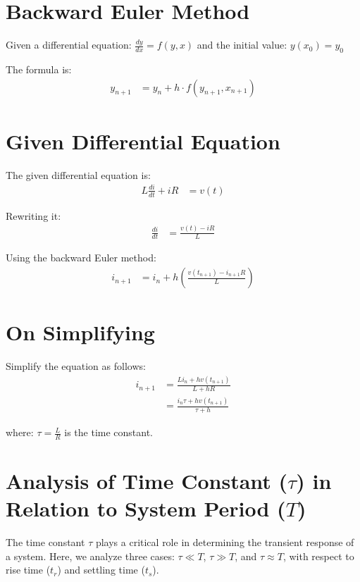 \documentclass{article}
\begin{document}
\section*{Backward Euler Method}

Given a differential equation:  
$ \frac{dy}{dx} = f(y, x) $  
and the initial value:  
$ y(x_0) = y_0 $  

The formula is:  
\begin{align*}
y_{n+1} &= y_n + h \cdot f(y_{n+1}, x_{n+1})
\end{align*}

\section*{Given Differential Equation}

The given differential equation is:  
\begin{align*}
L \frac{di}{dt} + iR &= v(t)
\end{align*}

Rewriting it:  
\begin{align*}
\frac{di}{dt} &= \frac{v(t) - iR}{L}
\end{align*}

Using the backward Euler method:  
\begin{align*}
i_{n+1} &= i_n + h \left( \frac{v(t_{n+1}) - i_{n+1}R}{L} \right)
\end{align*}

\section*{On Simplifying}

Simplify the equation as follows:  
\begin{align*}
i_{n+1} &= \frac{L i_n + h v(t_{n+1})}{L + hR} \\
&= \frac{i_n \tau + h v(t_{n+1})}{\tau + h}
\end{align*}

where:  
$ \tau = \frac{L}{R} $ is the time constant.


\section*{Analysis of Time Constant ($\tau$) in Relation to System Period ($T$)}

The time constant $\tau$ plays a critical role in determining the transient response of a system. Here, we analyze three cases: 
$\tau \ll T$, $\tau \gg T$, and $\tau \approx T$, with respect to rise time ($t_r$) and settling time ($t_s$).
\end{document}

